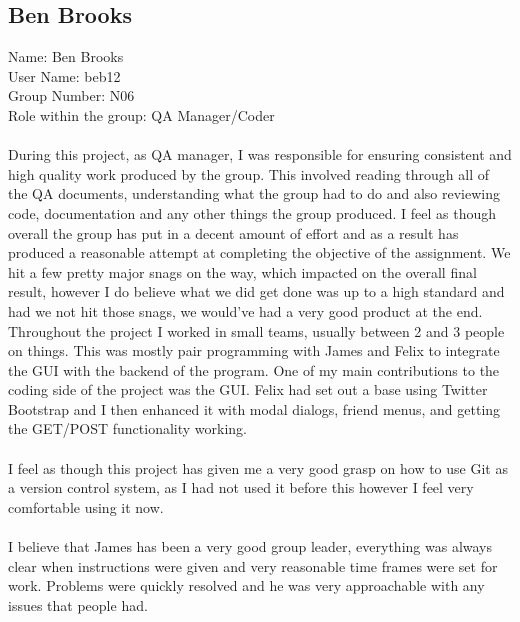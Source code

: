 \documentclass[titlepage]{article}
\begin{document}
{\subsection {Ben Brooks}
\normalsize{Name: Ben Brooks}
\\
\normalsize{User Name: beb12}
\\
\normalsize{Group Number: N06}
\\
\normalsize{Role within the group: QA Manager/Coder}
\\
\\
\normalsize {During this project, as QA manager, I was responsible for ensuring consistent and high quality work produced by the group. This involved reading through all of the QA documents, understanding what the group had to do and also reviewing code, documentation and any other things the group produced. I feel as though overall the group has put in a decent amount of effort and as a result has produced a reasonable attempt at completing the objective of the assignment. We hit a few pretty major snags on the way, which impacted on the overall final result, however I do believe what we did get done was up to a high standard and had we not hit those snags, we would've had a very good product at the end.
\\ 
Throughout the project I worked in small teams, usually between 2 and 3 people on things. This was mostly pair programming with James and Felix to integrate the GUI with the backend of the program. One of my main contributions to the coding side of the project was the GUI. Felix had set out a base using Twitter Bootstrap and I then enhanced it with modal dialogs, friend menus, and getting the GET/POST functionality working.
\\
\\
I feel as though this project has given me a very good grasp on how to use Git as a version control system, as I had not used it before this however I feel very comfortable using it now.
\\
\\
I believe that James has been a very good group leader, everything was always clear when instructions were given and very reasonable time frames were set for work. Problems were quickly resolved and he was very approachable with any issues that people had.
}}
\end{document}
